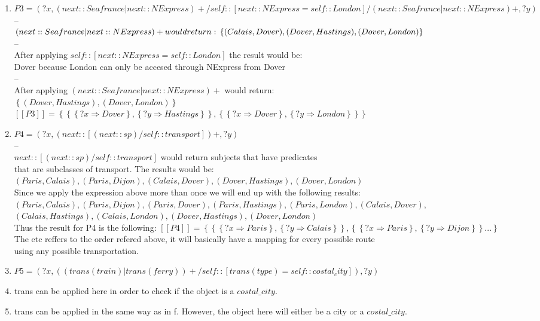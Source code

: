 \documentclass[DIN, pagenumber=false, fontsize=11pt, parskip=half]{scrartcl}
\begin{document}
\begin{enumerate}[label=\alph*)]
\item 
$P3 = (?x, (next :: Seafrance | next :: NExpress)+ / self :: [next :: NExpress = self :: London]
/ (next :: Seafrance | next :: NExpress)+, ?y)$\\
--\\
$(next :: Seafrance | next :: NExpress)+ would return:\\
\left\{ (Calais, Dover),(Dover, Hastings),(Dover,London)\right\}$\\
--\\
After applying $self :: [next :: NExpress = self :: London]$ the result would be:\\
Dover because London can only be accesed through NExpress from Dover\\
--\\
After applying $(next :: Seafrance | next :: NExpress)+$ would return:\\
$\left\{(Dover, Hastings),(Dover,London)\right\}$\\
$ [\![P3]\!] = \left\{\left\{\left\{ ?x \Rightarrow Dover \right\},\left\{ ?y \Rightarrow Hastings \right\}\right\},\left\{\left\{ ?x \Rightarrow Dover \right\},\left\{ ?y \Rightarrow London \right\}\right\}\right\}$\\
\item 

$P4 = (?x, (next :: [(next :: sp) / self :: transport])+, ?y)$\\
--\\
$next :: [(next :: sp) / self :: transport]$ would return subjects that have predicates\\
that are subclasses of transport. The results would be:\\
$(Paris,Calais), (Paris,Dijon), (Calais, Dover), (Dover,Hastings), (Dover,London)$\\
Since we apply the expression above more than once we will end up with the following results:\\
$(Paris,Calais), (Paris,Dijon), (Paris,Dover), (Paris,Hastings), (Paris, London), (Calais, Dover),$\\
$(Calais, Hastings), (Calais,London), (Dover,Hastings), (Dover,London)$\\
Thus the result for P4 is the following:
$ [\![P4]\!] = \left\{\left\{\left\{ ?x \Rightarrow Paris \right\},\left\{ ?y \Rightarrow Calais \right\}\right\},\left\{\left\{ ?x \Rightarrow Paris \right\},\left\{ ?y \Rightarrow Dijon \right\}\right\}...\right\}$\\
The etc reffers to the order refered above, it will basically have a mapping for every possible route \\
using any possible transportation.\\

\item 
$P5 = (?x, ((trans(train)|trans(ferry))+ / self :: [trans(type) = sel f :: costal_city]), ?y)$\\
\item 
trans can be applied here in order to check if the object is a $costal\_city$.
\item 
trans can be applied in the same way as in f. However, the object here will either be a city or a $costal\_city$.
\end{enumerate}
\end{document}
